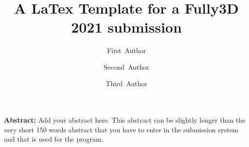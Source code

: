 \documentclass[11pt,twocolumn,twoside]{article}
\begin{document}
\title{A LaTex Template for a Fully3D 2021 submission} 

\author[1]{\small First~Author}
\author[1]{\small Second~Author}
\author[2]{\small Third~Author}



\maketitle
\thispagestyle{fancy}




\footnotesize
\textbf{Abstract:}
Add your abstract here. This abstract can be slightly longer than the very short 
150 words abstract that you have to enter in the submission system and that is used 
for the program. 

\normalsize







\footnotesize


\end{document}
